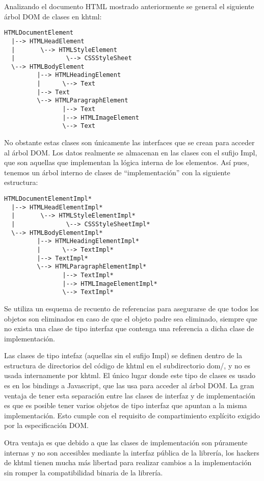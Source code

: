 Analizando el documento HTML mostrado anteriormente se general el siguiente árbol DOM de clases en khtml:

\begin{verbatim}
HTMLDocumentElement
  |--> HTMLHeadElement
  |       \--> HTMLStyleElement
  |              \--> CSSStyleSheet
  \--> HTMLBodyElement
         |--> HTMLHeadingElement
         |      \--> Text
         |--> Text
         \--> HTMLParagraphElement
                |--> Text
                |--> HTMLImageElement
                \--> Text
\end{verbatim}

No obstante estas clases son únicamente las interfaces que se crean para acceder al árbol DOM. Los datos realmente se almacenan en las clases con el sufijo Impl, que son aquellas que implementan la lógica interna de los elementos. Así pues, tenemos un árbol interno de clases de ``implementación'' con la siguiente estructura:

\begin{verbatim}
HTMLDocumentElementImpl*
  |--> HTMLHeadElementImpl*
  |       \--> HTMLStyleElementImpl*
  |              \--> CSSStyleSheetImpl*
  \--> HTMLBodyElementImpl*
         |--> HTMLHeadingElementImpl*
         |      \--> TextImpl*
         |--> TextImpl*
         \--> HTMLParagraphElementImpl*
                |--> TextImpl*
                |--> HTMLImageElementImpl*
                \--> TextImpl*
\end{verbatim}

Se utiliza un esquema de recuento de referencias para asegurarse de que todos los objetos son eliminados en caso de que el objeto padre sea eliminado, siempre que no exista una clase de tipo interfaz que contenga una referencia a dicha clase de implementación.

Las clases de tipo intefaz (aquellas sin el sufijo Impl) se definen dentro de la estructura de directorios del código de khtml en el subdirectorio dom/, y no es usada internamente por khtml. El único lugar donde este tipo de clases es usado es en los bindings a Javascript, que las usa para acceder al árbol DOM. La gran ventaja de tener esta separación entre las clases de interfaz y de implementación es que es posible tener varios objetos de tipo interfaz que apuntan a la misma implementación. Esto cumple con el requisito de compartimiento explícito exigido por la especificación DOM.

Otra ventaja es que debido a que las clases de implementación son púramente internas y no son accesibles mediante la interfaz pública de la librería, los hackers de khtml tienen mucha más libertad para realizar cambios a la implementación sin romper la compatibilidad binaria de la librería.

